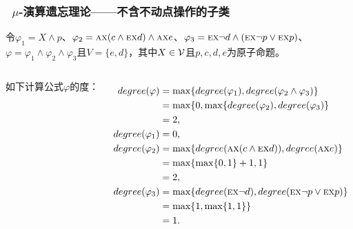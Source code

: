 \documentclass[9pt, CJK]{beamer}
\begin{document}
\begin{frame}
	\frametitle{~$\mu$-演算遗忘理论——{\footnotesize 不含不动点操作的子类}}
{\tiny	\begin{example}
		\label{exp:x-class}
		令$\varphi_1 = X \wedge p$、$\varphi_2 = \textsc{a}\textsc{x}(c \wedge \textsc{e}\textsc{x} d) \wedge \textsc{a}\textsc{x} e$、$\varphi_3 = \textsc{e}\textsc{x} \neg d \wedge (\textsc{e}\textsc{x} \neg p \vee \textsc{e}\textsc{x} p)$、$\varphi = \varphi_1 \wedge \varphi_2 \wedge \varphi_3$且$V = \{e,d\}$，其中$X \in {\cal V}$且$p, c, d, e$为原子命题。
		\begin{columns}
			
		如下计算公式$\varphi$的度：
		
		\begin{align*}
			degree(\varphi) &  =  \max\{degree(\varphi_1), degree(\varphi_2 \wedge \varphi_3)\}\\
			& = \max\{0, \max\{degree(\varphi_2), degree(\varphi_3)\}\\
			& = 2,\\
			degree(\varphi_1) & = 0,\\
			degree(\varphi_2) & = \max\{degree(\textsc{a}\textsc{x}(c \wedge \textsc{e}\textsc{x} d)), degree(\textsc{a}\textsc{x} e)\}\\
			& =\max\{\max\{0, 1\} + 1, 1\}\\
			& = 2,\\
			degree(\varphi_3) & = \max\{degree(\textsc{e}\textsc{x} \neg d), degree(\textsc{e}\textsc{x} \neg p \vee \textsc{e}\textsc{x} p)\}\\
			& = \max\{1, \max\{1,1\}\}\\
			& = 1.
		\end{align*}
		

\end{columns}
\end{example}}
\end{frame}
\end{document}

